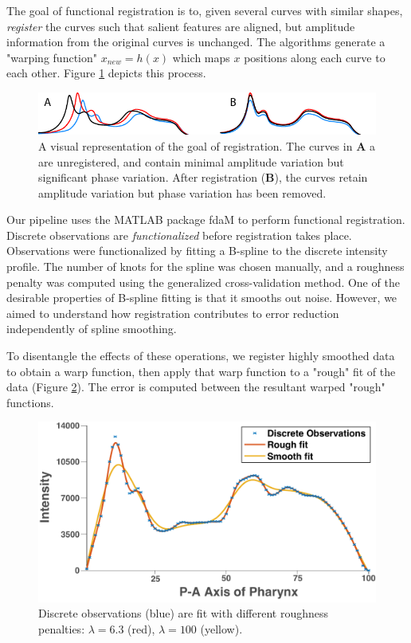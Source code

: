 The goal of functional registration is to, given several curves with similar shapes, \textit{register} the curves such that salient features are aligned, but amplitude information from the original curves is unchanged. The algorithms generate a "warping function" $x_{new} = h(x)$ which maps $x$ positions along each curve to each other. Figure \ref{fig:FunctionalRegistrationCartoon} depicts this process. 

\begin{figure}[ht]
    \centering
    \includegraphics{Figures/rendered_files/functional_registration}
    \decoRule
    \caption[Functional registration of intensity profiles]{A visual representation of the goal of registration. The curves in \textbf{A} a are unregistered, and contain minimal amplitude variation but significant phase variation. After registration (\textbf{B}), the curves retain amplitude variation but phase variation has been removed.}
    \label{fig:FunctionalRegistrationCartoon}
\end{figure}

Our pipeline uses the MATLAB package fdaM to perform functional registration. Discrete observations are \textit{functionalized} before registration takes place. Observations were functionalized by fitting a B-spline to the discrete intensity profile. The number of knots for the spline was chosen manually, and a roughness penalty was computed using the generalized cross-validation method. One of the desirable properties of B-spline fitting is that it smooths out noise. However, we aimed to understand how registration contributes to error reduction independently of spline smoothing. 

To disentangle the effects of these operations, we register highly smoothed data to obtain a warp function, then apply that warp function to a "rough" fit of the data (Figure \ref{fig:SmoothRough}). The error is computed between the resultant warped "rough" functions.

\begin{figure}[ht]
    \centering
    \includegraphics[scale=0.6]{Figures/rendered_files/smoothRough}
    \decoRule
    \caption[Smooth vs. rough functionalization]{Discrete observations (blue) are fit with different roughness penalties: $\lambda=6.3$ (red), $\lambda=100$ (yellow).}
    \label{fig:SmoothRough}
\end{figure}